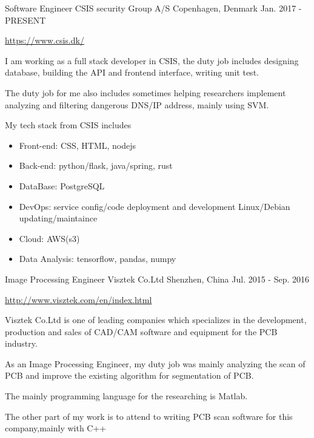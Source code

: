 \begin{cventries}
  \cventry
    {Software Engineer}
    {CSIS security Group A/S}
    {Copenhagen, Denmark}
    {Jan. 2017 - PRESENT}
    {
      \begin{cvitems}
        \item {\url{https://www.csis.dk/}}
        \item {I am working as a full stack developer in CSIS, the duty job includes designing database, building the API and frontend interface, writing unit test.}
        \item {The duty job for me also includes sometimes helping researchers implement analyzing and filtering dangerous  DNS/IP address, mainly using SVM.}
        \item {
	    My tech stack from CSIS includes
	    \begin{itemize}
		\item Front-end: CSS, HTML, nodejs
		\item Back-end: python/flask, java/spring, rust
		\item DataBase: PostgreSQL
		\item DevOps: service config/code deployment and development Linux/Debian updating/maintaince
		\item Cloud: AWS(s3)
		\item Data Analysis: tensorflow, pandas, numpy
	    \end{itemize}
	}
      \end{cvitems}
    }
  \cventry
    {Image Processing Engineer}
    {Visztek Co.Ltd}
    {Shenzhen, China}
    {Jul. 2015 - Sep. 2016}
    {
      \begin{cvitems}
        \item {\url{http://www.visztek.com/en/index.html}}
        \item {Visztek Co.Ltd is one of leading companies which specializes in the development, production and sales of CAD/CAM software and equipment for the PCB industry.}
        \item {As an Image Processing Engineer, my duty job was mainly analyzing the scan of PCB and improve the existing algorithm for segmentation of PCB.}
        \item {The mainly programming language for the researching is Matlab.}
        \item {The other part of my work is to attend to writing PCB scan software for this company,mainly with C++}
      \end{cvitems}
    }
\end{cventries}
